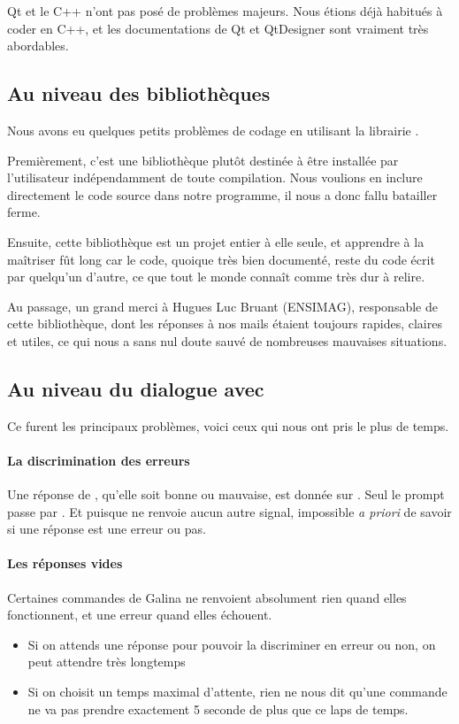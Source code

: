 		Qt et le C++ n'ont pas posé de problèmes majeurs. Nous étions déjà habitués à coder en C++, et les documentations de Qt et QtDesigner sont vraiment très abordables.
        
    \subsection{Au niveau des bibliothèques}
    
        Nous avons eu quelques petits problèmes de codage en utilisant la librairie \qcodeedit.

        Premièrement, c'est une bibliothèque plutôt destinée à être installée par l'utilisateur indépendamment de toute compilation.
        Nous voulions en inclure directement le code source dans notre programme, il nous a donc fallu batailler ferme.
        
        Ensuite, cette bibliothèque est un projet entier à elle seule, et apprendre à la maîtriser fût long car le code, quoique très bien documenté, reste du code écrit par quelqu'un d'autre, ce que tout le monde connaît comme très dur à relire.

        Au passage, un grand merci à Hugues Luc Bruant (ENSIMAG), responsable de cette bibliothèque, dont les réponses à nos mails étaient toujours rapides, claires et utiles, ce qui nous a sans nul doute sauvé de nombreuses mauvaises situations.
		
    \subsection{Au niveau du dialogue avec \coq}
    
        Ce furent les principaux problèmes, voici ceux qui nous ont pris le plus de temps.
        \paragraph*{La discrimination des erreurs\\}
        	Une réponse de \coqtop, qu'elle soit bonne ou mauvaise, est donnée sur \stdout. Seul le prompt passe par \stderr.
        	Et puisque \coqtop ne renvoie aucun autre signal, impossible \textit{a priori} de savoir si une réponse est une erreur ou pas.
        \paragraph*{Les réponses vides\\}
        	Certaines commandes de Galina ne renvoient absolument rien quand elles fonctionnent, et une erreur quand elles échouent.
        	\begin{itemize}
        		\item Si on attends une réponse pour pouvoir la discriminer en erreur ou non, on peut attendre très longtemps
        		\item Si on choisit un temps maximal d'attente, rien ne nous dit qu'une commande ne va pas prendre exactement 5 seconde de plus que ce laps de temps.
        	\end{itemize}
